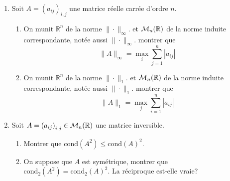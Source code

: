 \documentclass[a4paper]{article}
\begin{document}
\begin{enumerate}
\item Soit $A=\left(a_{ij}\right)_{i,j}$ une matrice réelle carrée d'ordre $n$.
\begin{enumerate}
\item On munit $\mathbb{R}^n$ de la norme $\|\cdot \|_\infty$. et ${\cal M}_n(\mathbb{R})$ de la norme induite correspondante, notée aussi $\|\cdot \|_\infty$. montrer que
\[ \| A \|_\infty=\max_i\sum_{j=1}^n|a_{ij}|\]

\item On munit $\mathbb{R}^n$ de la norme $\|\cdot \|_1$. et ${\cal M}_n(\mathbb{R})$ de la norme induite correspondante, notée aussi $\|\cdot \|_1$. montrer que
\[ \| A \|_1=\max_j\sum_{i=1}^n|a_{ij}|\]

\end{enumerate}
\item Soit $A=\left(a_{ij}\right)_{i,j}\in {\cal M}_n(\mathbb{R})$ une matrice inversible.
\begin{enumerate}
\item Montrer que $\mbox{cond}(A^2)\leq \mbox{cond}(A)^2$.
\item On suppose que $A$ est symétrique, montrer que $\mbox{cond}_2(A^2)= \mbox{cond}_2(A)^2$. La réciproque est-elle vraie?

\end{enumerate}
\end{enumerate}

\end{document}
